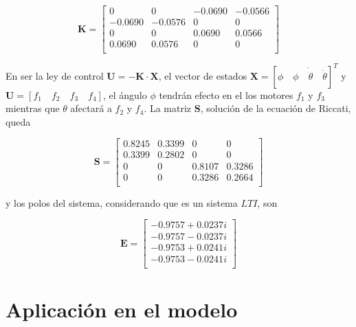 \documentclass[twoside,11pt]{book}
\begin{document}
\begin{equation}
\mathbf{K}= \left[ \begin{array}{cccc}
         0  &      0  &  -0.0690  & -0.0566 \\
   -0.0690 &   -0.0576    &     0    &     0 \\
         0    &     0 &   0.0690  &  0.0566 \\
    0.0690  &  0.0576    &     0    &     0 \\ \end{array} \right]
   \label{Kmatrix}
\end{equation}

En ser la ley de control $\pmb{U}=-\mathbf{K}\cdot \mathbf{X}$, el vector de estados $\mathbf{X}=[\phi \quad \dot{\phi \quad \theta \quad \dot{\theta}}]^{T}$ y $\mathbf{U}=[f_{1} \quad f_{2} \quad f_{3} \quad f_{4}]$, el ángulo $\phi$ tendrán efecto en el los motores $f_{1}$ y  $f_{3}$ mientras que $\theta$ afectará a $f_{2}$ y $f_{4}$. La matriz $\mathbf{S}$, solución de la ecuación de Riccati, queda

\begin{equation}
\mathbf{S}= \left[ \begin{array}{cccc}

    0.8245  &  0.3399    &     0 &        0 \\
    0.3399  &  0.2802    &     0   &      0 \\
         0  &       0  &  0.8107  &  0.3286 \\
         0   &      0  & 0.3286  &  0.2664 \\ \end{array}     \right]
\end{equation}

y los polos del sistema, considerando que es un sistema $LTI$, son

\begin{equation}
\mathbf{E}= \left[ \begin{array}{c}
  -0.9757 + 0.0237i \\
  -0.9757 - 0.0237i \\
  -0.9753 + 0.0241i \\
  -0.9753 - 0.0241i \\
\end{array} \right] 
\end{equation}

\section{Aplicación en el modelo}
\end{document}

